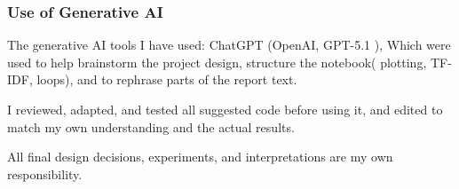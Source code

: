 \documentclass[9pt,twocolumn,twoside]{pnas-new}
\begin{document}
\subsubsection*{Use of Generative AI}

The generative AI tools I have used: ChatGPT (OpenAI, GPT-5.1 ), Which were used to help brainstorm the project design, structure the notebook( plotting, TF-IDF,  loops), and to rephrase parts of the report text.



I reviewed, adapted, and tested all suggested code before using it, and edited to match my own understanding and the actual results. 

All final design decisions, experiments, and interpretations are my own responsibility.
\end{document}
